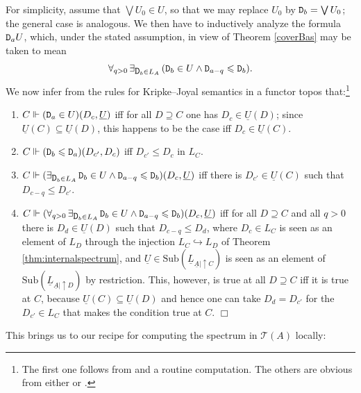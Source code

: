 \documentclass[11pt]{article}
\newcommand{\drie}{\vartriangleleft}
\newcommand{\beq}{\begin{equation}}
\newcommand{\eeq}{\end{equation}}
\newcommand{\alg}[1]{\ensuremath{#1}}
\newcommand{\asstopos}{\ensuremath{\mathcal{T}}}
\newcommand{\prop}[1]{\ensuremath{\mbox{\texttt{#1}}}}
\newcommand{\uA}{\underline{A}}
\newcommand{\TA}{\mathcal{T}(A)}
\renewcommand{\TA}{\asstopos(\alg{A})}
\newenvironment{proof}[1][Proof]%
{ \begin{trivlist}%
  \item[\hskip \labelsep {\bfseries #1}]%
}%
{ \end{trivlist}%
}
\newcommand{\qed}{\nobreak\hfill$\Box$}
\begin{document}
\begin{proof}
For simplicity,   assume  that $\bigvee U_0\in U$, so that we may replace $U_0$ by $\prop{D}_b=\bigvee U_0$; the general case is analogous. We then have to inductively analyze the formula $ \prop{D}_a \drie U$, 
 which, under the stated assumption,  in view of Theorem \ref{coverBas} may be taken to mean
\beq
 \forall_{q>0}\, \exists_{\prop{D}_b\in L_A}\, (\prop{D}_b\in U\wed  \prop{D}_{a-q}\leqslant \prop{D}_b). \label{meaning}
\eeq
We now  infer from the rules for  Kripke--Joyal semantics in a functor topos that:\footnote{The first one follows from 
\cite[Prop.\ 6.6.10]{borceux3} and a routine computation. The others are obvious from either  \cite[\S VI.7]{maclanemoerdijk92}
or \cite[\S 6.6]{borceux3}.}
 \begin{enumerate}
\item  $C\Vdash(\prop{D}_a\in U)(D_c,\underline{U})$ iff   for all $D\supseteq C$ one has $D_c\in \underline{U}(D)$; 
since $\underline{U}(C)\subseteq \underline{U}(D)$, this happens to be the case iff
$D_c\in \underline{U}(C)$.
\item $C\Vdash(\prop{D}_b\leqslant \prop{D}_a)(D_{c'},D_c)$ iff $D_{c'}\leqslant D_c$ in $L_C$.
\item $C\Vdash(\exists_{\prop{D}_b\in L_A}\, \prop{D}_b\in U\wed  \prop{D}_{a-q}\leqslant \prop{D}_b)(D_c,\underline{U})$
iff there is $D_{c'}\in \underline{U}(C)$ such that $D_{c-q}\leqslant D_{c'}$.
\item  $C\Vdash(\forall_{q>0}\, \exists_{\prop{D}_b\in L_A}\, \prop{D}_b\in U\wed  \prop{D}_{a-q}\leqslant \prop{D}_b)(D_c,\underline{U})$ iff for all $D\supseteq C$ and all $q>0$ there is $D_d\in \underline{U}(D)$ such that $D_{c-q}\leqslant D_d$,
where  $D_c\in L_C$ is seen as an element of $L_D$ through the injection $L_C\hookrightarrow L_D$ of 
Theorem \ref{thm:internalspectrum}, and  $\underline{U}\in \mathrm{Sub}(\underline{L}_{\uA|\uparrow C})$
is seen as an element of $\mathrm{Sub}(\underline{L}_{\uA|\uparrow D})$ by restriction.
 This, however,  is true at all $D\supseteq C$ iff it is true at $C$, because $\underline{U}(C)\subseteq \underline{U}(D)$ and hence one can take $D_d=D_{c'}$ for the $D_{c'}\in L_C$ that makes the condition true at $C$. \qed
 \end{enumerate}
\end{proof}
This brings us to our recipe for computing the spectrum in $\TA$  locally:
\end{document}
